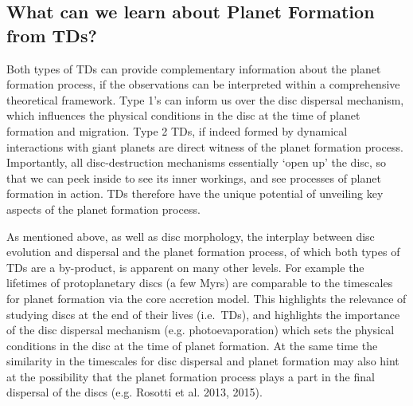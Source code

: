 \documentclass[10pt,fleqn,twoside]{article}
\begin{document}
\subsection{What can we learn about Planet Formation from TDs? }

Both types of TDs can provide complementary information about the
planet formation process, if the observations can be interpreted
within a comprehensive theoretical framework. Type 1's
can inform us over the disc dispersal mechanism, which influences the
physical conditions in the disc at the time of planet formation and
migration. Type 2 TDs, if indeed formed by dynamical interactions with
giant planets are direct witness of the planet formation
process. Importantly, all disc-destruction mechanisms essentially `open up' the
  disc, so that we can peek inside to see its inner workings, and see
  processes of planet formation in action. TDs therefore
  have the unique potential of unveiling key aspects of the planet formation
process.

As mentioned above, as well as disc morphology, the interplay between disc evolution and
dispersal and the planet formation process, of which both types of TDs
are a
by-product, is apparent on many other
 levels. For example the lifetimes of protoplanetary discs (a few
Myrs) are comparable to the timescales for planet formation via the core
accretion model. This highlights the relevance of studying discs at the end
of their lives (i.e.\ TDs), and highlights the importance
of the disc dispersal mechanism (e.g. photoevaporation) which sets the
physical conditions in the disc at the time of planet formation. 
At the same time the similarity in the timescales for disc dispersal
and planet formation may also hint at the possibility that the planet
formation process plays a part in the final dispersal of the discs
(e.g. Rosotti et al. 2013, 2015). 
\end{document}
